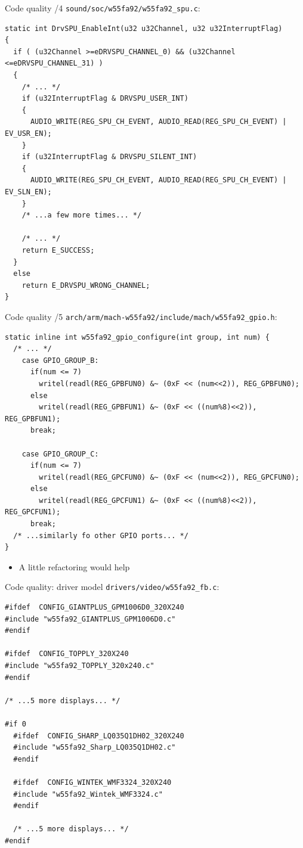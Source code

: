 \documentclass[xetex,table]{beamer}
\begin{document}
\begin{frame}[fragile]{Code quality /4}
  \texttt{sound/soc/w55fa92/w55fa92\_spu.c}:

  \linespread{0.5}
  \begin{verbatim}
static int DrvSPU_EnableInt(u32 u32Channel, u32 u32InterruptFlag)
{
  if ( (u32Channel >=eDRVSPU_CHANNEL_0) && (u32Channel <=eDRVSPU_CHANNEL_31) )
  {
    /* ... */
    if (u32InterruptFlag & DRVSPU_USER_INT)
    {
      AUDIO_WRITE(REG_SPU_CH_EVENT, AUDIO_READ(REG_SPU_CH_EVENT) | EV_USR_EN);
    }
    if (u32InterruptFlag & DRVSPU_SILENT_INT)
    {
      AUDIO_WRITE(REG_SPU_CH_EVENT, AUDIO_READ(REG_SPU_CH_EVENT) | EV_SLN_EN);
    }
    /* ...a few more times... */

    /* ... */
    return E_SUCCESS;
  }
  else
    return E_DRVSPU_WRONG_CHANNEL;
}
  \end{verbatim}
\end{frame}

\begin{frame}[fragile]{Code quality /5}
  \texttt{arch/arm/mach-w55fa92/include/mach/w55fa92\_gpio.h}:

  \linespread{1}
  \begin{verbatim}
static inline int w55fa92_gpio_configure(int group, int num) {
  /* ... */
    case GPIO_GROUP_B:
      if(num <= 7)
        writel(readl(REG_GPBFUN0) &~ (0xF << (num<<2)), REG_GPBFUN0);
      else
        writel(readl(REG_GPBFUN1) &~ (0xF << ((num%8)<<2)), REG_GPBFUN1);
      break;

    case GPIO_GROUP_C:
      if(num <= 7)
        writel(readl(REG_GPCFUN0) &~ (0xF << (num<<2)), REG_GPCFUN0);
      else
        writel(readl(REG_GPCFUN1) &~ (0xF << ((num%8)<<2)), REG_GPCFUN1);
      break;
  /* ...similarly fo other GPIO ports... */
}
  \end{verbatim}

  \begin{itemize}
  \item A little refactoring would help
  \end{itemize}
\end{frame}

\begin{frame}[fragile]{Code quality: driver model}
  \texttt{drivers/video/w55fa92\_fb.c}:

  \linespread{0.9}
  \begin{verbatim}
#ifdef  CONFIG_GIANTPLUS_GPM1006D0_320X240
#include "w55fa92_GIANTPLUS_GPM1006D0.c"
#endif

#ifdef  CONFIG_TOPPLY_320X240
#include "w55fa92_TOPPLY_320x240.c"
#endif

/* ...5 more displays... */

#if 0
  #ifdef  CONFIG_SHARP_LQ035Q1DH02_320X240
  #include "w55fa92_Sharp_LQ035Q1DH02.c"
  #endif

  #ifdef  CONFIG_WINTEK_WMF3324_320X240
  #include "w55fa92_Wintek_WMF3324.c"
  #endif

  /* ...5 more displays... */
#endif
  \end{verbatim}
\end{frame}
\end{document}
